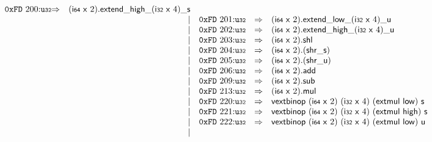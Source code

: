 $$\begin{array}{@{}l@{}rrlll@{}l@{}}
\mathtt{0xFD}~200{:}{\mathtt{u{\scriptstyle32}}} &\Rightarrow& (\mathsf{i{\scriptstyle64}}~\mathsf{x}~2) . {{{{{{\mathsf{extend}}{\mathsf{\_}}}{\mathsf{high}}}{\mathsf{\_}}}{(\mathsf{i{\scriptstyle32}}~\mathsf{x}~4)}}{\mathsf{\_}}}{\mathsf{s}} \\ &&|&
\mathtt{0xFD}~201{:}{\mathtt{u{\scriptstyle32}}} &\Rightarrow& (\mathsf{i{\scriptstyle64}}~\mathsf{x}~2) . {{{{{{\mathsf{extend}}{\mathsf{\_}}}{\mathsf{low}}}{\mathsf{\_}}}{(\mathsf{i{\scriptstyle32}}~\mathsf{x}~4)}}{\mathsf{\_}}}{\mathsf{u}} \\ &&|&
\mathtt{0xFD}~202{:}{\mathtt{u{\scriptstyle32}}} &\Rightarrow& (\mathsf{i{\scriptstyle64}}~\mathsf{x}~2) . {{{{{{\mathsf{extend}}{\mathsf{\_}}}{\mathsf{high}}}{\mathsf{\_}}}{(\mathsf{i{\scriptstyle32}}~\mathsf{x}~4)}}{\mathsf{\_}}}{\mathsf{u}} \\ &&|&
\mathtt{0xFD}~203{:}{\mathtt{u{\scriptstyle32}}} &\Rightarrow& (\mathsf{i{\scriptstyle64}}~\mathsf{x}~2) . \mathsf{shl} \\ &&|&
\mathtt{0xFD}~204{:}{\mathtt{u{\scriptstyle32}}} &\Rightarrow& (\mathsf{i{\scriptstyle64}}~\mathsf{x}~2) . ({\mathsf{shr\_}}{\mathsf{s}}) \\ &&|&
\mathtt{0xFD}~205{:}{\mathtt{u{\scriptstyle32}}} &\Rightarrow& (\mathsf{i{\scriptstyle64}}~\mathsf{x}~2) . ({\mathsf{shr\_}}{\mathsf{u}}) \\ &&|&
\mathtt{0xFD}~206{:}{\mathtt{u{\scriptstyle32}}} &\Rightarrow& (\mathsf{i{\scriptstyle64}}~\mathsf{x}~2) . \mathsf{add} \\ &&|&
\mathtt{0xFD}~209{:}{\mathtt{u{\scriptstyle32}}} &\Rightarrow& (\mathsf{i{\scriptstyle64}}~\mathsf{x}~2) . \mathsf{sub} \\ &&|&
\mathtt{0xFD}~213{:}{\mathtt{u{\scriptstyle32}}} &\Rightarrow& (\mathsf{i{\scriptstyle64}}~\mathsf{x}~2) . \mathsf{mul} \\ &&|&
\mathtt{0xFD}~220{:}{\mathtt{u{\scriptstyle32}}} &\Rightarrow& \mathsf{vextbinop}~(\mathsf{i{\scriptstyle64}}~\mathsf{x}~2)~(\mathsf{i{\scriptstyle32}}~\mathsf{x}~4)~(\mathsf{extmul}~\mathsf{low})~\mathsf{s} \\ &&|&
\mathtt{0xFD}~221{:}{\mathtt{u{\scriptstyle32}}} &\Rightarrow& \mathsf{vextbinop}~(\mathsf{i{\scriptstyle64}}~\mathsf{x}~2)~(\mathsf{i{\scriptstyle32}}~\mathsf{x}~4)~(\mathsf{extmul}~\mathsf{high})~\mathsf{s} \\ &&|&
\mathtt{0xFD}~222{:}{\mathtt{u{\scriptstyle32}}} &\Rightarrow& \mathsf{vextbinop}~(\mathsf{i{\scriptstyle64}}~\mathsf{x}~2)~(\mathsf{i{\scriptstyle32}}~\mathsf{x}~4)~(\mathsf{extmul}~\mathsf{low})~\mathsf{u} \\ &&|&

\end{array}$$
